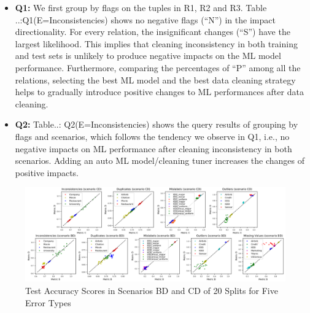 \begin{itemize}
	\item {
		\textbf{Q1:} We first group by flags on the tuples in R1, R2 and R3. 
		Table ..:Q1(E=Inconsistencies) shows no negative flags (“N”) in the
		impact directionality. For every relation, the insignificant changes
		(“S”) have the largest likelihood. 
		This implies that cleaning inconsistency in both training and test sets is unlikely to produce negative
		impacts on the ML model performance. Furthermore, comparing the percentages of “P” among all the relations, selecting the best ML model and the best data cleaning strategy helps to gradually
		introduce positive changes to ML performances after data cleaning.
	}
	\item {
		\textbf{Q2:} Table..: Q2(E=Inconsistencies) shows the query results
		of grouping by flags and scenarios, which follows the tendency we
		observe in Q1, i.e., no negative impacts on ML performance after cleaning inconsistency in both scenarios. Adding an auto ML model/cleaning tuner increases the changes of positive impacts.
	}
\end{itemize}

\begin{figure}[H]
	\centering
	\includegraphics[angle=-90,scale=.3]{Test_Accuracy_Scores_in_Scenarios_BD_and_CD_of_20_Splits_for_Five_Error_Types}
	\caption{Test Accuracy Scores in Scenarios BD and CD of 20 Splits for Five Error Types}
	\label{fig:Test_Accuracy_Scores_in_Scenarios_BD_and_CD_of_20_Splits_for_Five_Error_Types}
\end{figure}

